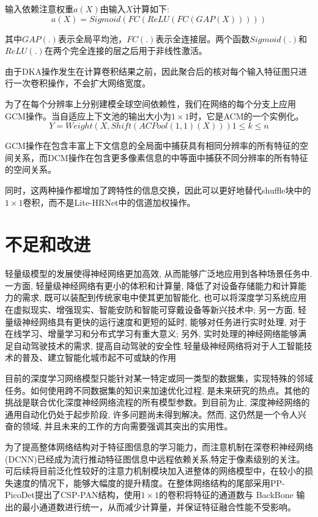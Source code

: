 \documentclass[hyperref]{ctexart}
\begin{document}
\begin{multicols}{2}
	输入依赖注意权重$a(X)$由输入$X$计算如下:
	$$a(X) = Sigmoid(FC(ReLU(FC(GAP(X)))))$$
	
	其中$GAP(.)$表示全局平均池，$FC(.)$表示全连接层。两个函数$Sigmoid(.)$和$ReLU(.)$在两个完全连接的层之后用于非线性激活。
	
	由于DKA操作发生在计算卷积结果之前，因此聚合后的核对每个输入特征图只进行一次卷积操作，不会扩大网络宽度。
	
	为了在每个分辨率上分别建模全球空间依赖性，我们在网络的每个分支上应用GCM操作。当自适应上下文池的输出大小为$1 \times1$时，它是ACM的一个实例化。
	$$Y = Weight(X, Shift(ACPool(1,1)(X))) 1\leq k \leq n$$
	
	GCM操作在包含丰富上下文信息的全局面中捕获具有相同分辨率的所有特征的空间关系，而DCM操作在包含更多像素信息的中等面中捕获不同分辨率的所有特征的空间关系。
	
	同时，这两种操作都增加了跨特性的信息交换，因此可以更好地替代shuffle块中的$1\times1$卷积，而不是Lite-HRNet\cite{DBLP:journals/corr/abs-2109-15099}中的信道加权操作。
	
	\section{不足和改进}
	轻量级模型的发展使得神经网络更加高效, 从而能够广泛地应用到各种场景任务中.一方面, 轻量级神经网络有更小的体积和计算量, 降低了对设备存储能力和计算能力的需求, 既可以装配到传统家电中使其更加智能化, 也可以将深度学习系统应用在虚拟现实、增强现实、智能安防和智能可穿戴设备等新兴技术中; 另一方面, 轻量级神经网络具有更快的运行速度和更短的延时, 能够对任务进行实时处理, 对于在线学习、增量学习和分布式学习有重大意义; 另外, 实时处理的神经网络能够满足自动驾驶技术的需求, 提高自动驾驶的安全性.轻量级神经网络将对于人工智能技术的普及、建立智能化城市起不可或缺的作用
	
	目前的深度学习网络模型只能针对某一特定或同一类型的数据集，实现特殊的邻域任务。如何使用跨不同数据集的知识来加速优化过程, 是未来研究的热点。其他的挑战是联合优化深度神经网络流程的所有模型参数。到目前为止, 深度神经网络的通用自动化仍处于起步阶段, 许多问题尚未得到解决。然而, 这仍然是一个令人兴奋的领域, 并且未来的工作的方向需要强调其突出的实用性。
	
	为了提高整体网络结构对于特征图信息的学习能力，而注意机制在深卷积神经网络(DCNN)已经成为流行推动特征图信息中远程依赖关系,特定于像素级别的关注。可后续将目前泛化性较好的注意力机制模块加入进整体的网络模型中，在较小的损失速度的情况下，能够大幅度的提升精度。在整体网络结构的尾部采用PP-PicoDet\cite{DBLP:journals/corr/abs-2111-00902}提出了CSP-PAN结构，使用$1×1$的卷积将特征的通道数与 BackBone 输出的最小通道数进行统一，从而减少计算量，并保证特征融合性能不受影响。
	\end{multicols}
\end{document}
